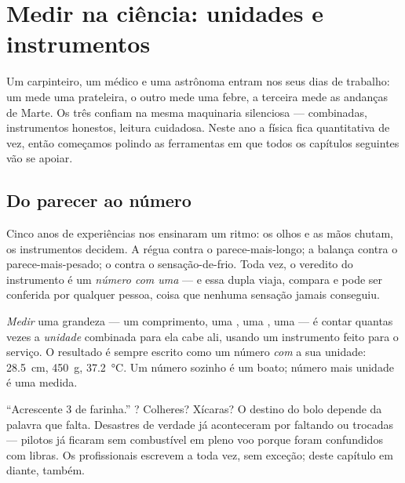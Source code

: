 \chapter{Medir na ciência: unidades e instrumentos}\label{ch:g6:measurement-in-science}

Um carpinteiro, um médico e uma astrônoma entram nos seus dias de
trabalho: um mede uma prateleira, o outro mede uma febre, a terceira
mede as andanças de Marte. Os três confiam na mesma maquinaria
silenciosa ---  combinadas, instrumentos honestos, leitura
cuidadosa. Neste ano a física fica quantitativa de vez, então
começamos polindo as ferramentas em que todos os capítulos seguintes
vão se apoiar.

\section{Do parecer ao número}

Cinco anos de experiências nos ensinaram um ritmo: os olhos e as mãos
chutam, os instrumentos decidem. A régua contra o parece-mais-longo;
a balança contra o parece-mais-pesado; o  contra o
sensação-de-frio. Toda vez, o veredito do instrumento é um
\emph{número com uma } --- e essa dupla viaja, compara e pode
ser conferida por qualquer pessoa, coisa que nenhuma sensação jamais
conseguiu.

\begin{definition}\label{def:g6:measurement-in-science:measuring}
\emph{Medir} uma grandeza --- um comprimento, uma ,
uma , uma  --- é contar quantas vezes a
\emph{unidade} combinada para ela cabe ali, usando um
instrumento feito para o serviço. O resultado é sempre escrito como
um número \emph{com} a sua unidade: \qty{28.5}{cm}, \qty{450}{g},
\qty{37.2}{\celsius}. Um número sozinho é um boato; número mais
unidade é uma medida.
\end{definition}

\begin{example}\label{ex:g6:measurement-in-science:missing}
``Acrescente 3 de farinha.'' ? Colheres? Xícaras? O destino do
bolo depende da palavra que falta. Desastres de verdade já
aconteceram por  faltando ou trocadas --- pilotos já ficaram
sem combustível em pleno voo porque  foram confundidos com
libras. Os profissionais escrevem a  toda vez, sem exceção;
deste capítulo em diante,  também.
\end{example}

